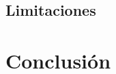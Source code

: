 \documentclass[11pt,a4paper]{article}
\begin{document}
\subsection{Limitaciones}

\section{Conclusión}

\end{document}
